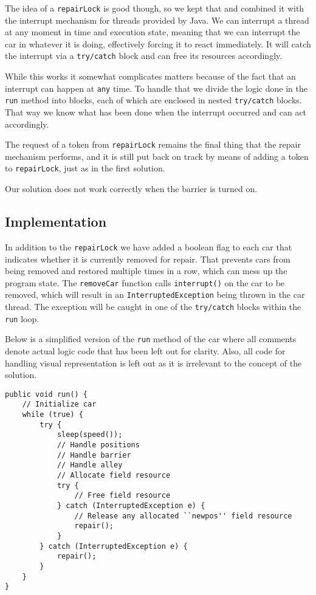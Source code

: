 The idea of a \texttt{repairLock} is good though, so we kept that and combined it with the interrupt mechanism for threads provided by Java. We can interrupt a thread at any moment in time and execution state, meaning that we can interrupt the car in whatever it is doing, effectively forcing it to react immediately. It will catch the interrupt via a \texttt{try/catch} block and can free its resources accordingly.

While this works it somewhat complicates matters because of the fact that an interrupt can happen at \texttt{any} time. To handle that we divide the logic done in the \texttt{run} method into blocks, each of which are enclosed in nested \texttt{try/catch} blocks. That way we know what has been done when the interrupt occurred and can act accordingly.

The request of a token from \texttt{repairLock} remains the final thing that the repair mechanism performs, and it is still put back on track by means of adding a token to \texttt{repairLock}, just as in the first solution.

Our solution does not work correctly when the barrier is turned on.

\subsection{Implementation}
In addition to the \texttt{repairLock} we have added a boolean flag to each car that indicates whether it is currently removed for repair. That prevents cars from being removed and restored multiple times in a row, which can mess up the program state. The \texttt{removeCar} function calls \texttt{interrupt()} on the car to be removed, which will result in an \texttt{InterruptedException} being thrown in the car thread. The exception will be caught in one of the \texttt{try/catch} blocks within the \texttt{run} loop.

Below is a simplified version of the \texttt{run} method of the car where all comments denote actual logic code that has been left out for clarity. Also, all code for handling visual representation is left out as it is irrelevant to the concept of the solution.

\begin{lstlisting}
public void run() {
	// Initialize car
	while (true) {
		try {
			sleep(speed());
			// Handle positions
			// Handle barrier
			// Handle alley
			// Allocate field resource
			try {
				// Free field resource
			} catch (InterruptedException e) {
				// Release any allocated ``newpos'' field resource
				repair();
			}
		} catch (InterruptedException e) {
			repair();
		}
	}
}
\end{lstlisting}

